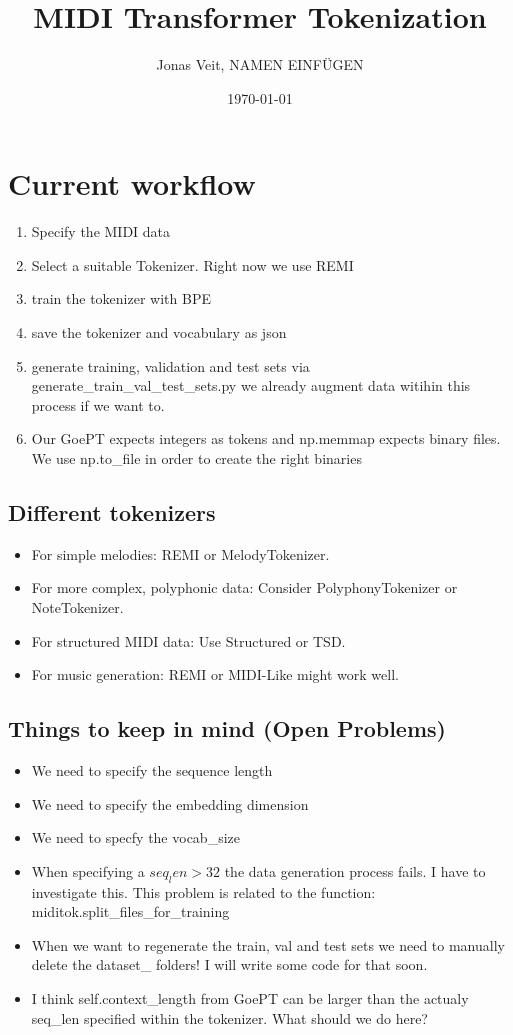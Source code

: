\documentclass{article}
\title{MIDI Transformer Tokenization}
\author{Jonas Veit, NAMEN EINFÜGEN }
\date{\today}
\begin{document}
    \maketitle
    \section*{Current workflow}
    \begin{enumerate}
        \item Specify the MIDI data
        \item Select a suitable Tokenizer. Right now we use REMI
        \item train the tokenizer with BPE
        \item save the tokenizer and vocabulary as json
        \item generate training, validation and test sets via generate\_train\_val\_test\_sets.py we already augment data witihin this process if we want to.
        \item Our GoePT expects integers as tokens and np.memmap expects binary files. We use np.to\_file in order to create the right binaries
    \end{enumerate}
    
    \subsection*{Different tokenizers}
    \begin{itemize}
        \item For simple melodies: REMI or MelodyTokenizer.
        \item For more complex, polyphonic data: Consider PolyphonyTokenizer or NoteTokenizer.
        \item For structured MIDI data: Use Structured or TSD.
        \item For music generation: REMI or MIDI-Like might work well.
    \end{itemize}

    \subsection*{Things to keep in mind (Open Problems)}
    \begin{itemize}
        \item We need to specify the sequence length
        \item We need to specify the embedding dimension
        \item We need to specfy the vocab\_size
        \item When specifying a $seq_len > 32$ the data generation process fails. I have to investigate this. This problem is related to the function: miditok.split\_files\_for\_training
        \item When we want to regenerate the train, val and test sets we need to manually delete the dataset\_ folders! I will write some code for that soon.
        \item I think self.context\_length from GoePT can be larger than the actualy seq\_len specified within the tokenizer. What should we do here?
    \end{itemize}
\end{document}
